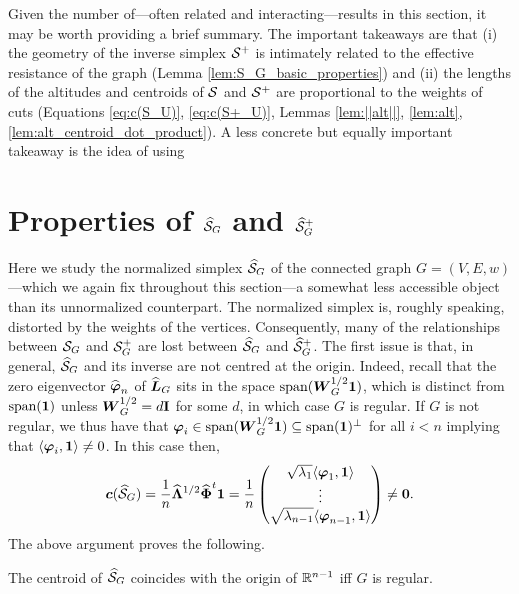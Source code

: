 Given the number of---often related and interacting---results in this section, it may be worth providing a brief summary. The important takeaways are that (i) the geometry of the inverse simplex $\mathcal{S}^+$ is intimately related to the effective resistance of the graph (Lemma \ref{lem:S_G_basic_properties}) and (ii) the lengths of the altitudes and centroids of $\mathcal{S}$ and $\mathcal{S}^+$ are proportional to the weights of cuts (Equations \eqref{eq:c(S_U)}, \eqref{eq:c(S+_U)}, Lemmas \ref{lem:||alt||}, \ref{lem:alt}, \ref{lem:alt_centroid_dot_product}). A less concrete but equally important takeaway is the idea of using  

\section{Properties of \texorpdfstring{$\widehat{\mathcal{S}}_G$}{the normalized Simplex} and \texorpdfstring{$\widehat{\mathcal{S}}_G^+$}{and its inverse}}
\label{sec:Sn_G}

Here we study the normalized simplex $\widehat{\mathcal{S}}_G$ of the connected graph $G=(V,E,w)$---which we again fix throughout this section---a somewhat less accessible object than its unnormalized counterpart.  The normalized simplex is, roughly speaking, distorted by the weights of the vertices. Consequently, many of the relationships between $\mathcal{S}_G$ and $\mathcal{S}_G^+$ are lost between $\widehat{\mathcal{S}}_G$ and $\widehat{\mathcal{S}}_G^+$. The first issue is that, in general, $\widehat{\mathcal{S}}_G$ and its inverse are not centred at the origin. Indeed, recall that the zero eigenvector $\widehat{\vb*{\varphi}}_n$ of $\widehat{\vb*{L}}_G$ sits in the space $\textnormal{span}(\vb*{W}^{1/2}_G\vb{1})$, which is distinct from $\textnormal{span}(\vb{1})$ unless $\vb*{W}^{1/2}_G=d\vb{I}$ for some $d$, in which case $G$ is regular.
If $G$ is not regular, we thus have that $\vb*{\varphi}_i \in \textnormal{span}(\vb*{W}^{1/2}_G\vb{1})\subseteq \textnormal{span}(\vb{1})^\perp$ for all $i<n$ implying that $\langle \vb*{\varphi}_i,\vb{1}\rangle \neq 0$. In this case then,  
 \[\vb*{c}(\widehat{\mathcal{S}}_G) = \frac{1}{n} \widehat{\vb{\Lambda}}^{1/2}\widehat{\boldsymbol{\Phi}}^t \vb{1} = \frac{1}{n} \begin{pmatrix}
 \sqrt{\lambda_1}\langle \vb*{\varphi}_1,\vb{1}\rangle \\
 \vdots \\
\sqrt{ \lambda_{n-1}}\langle \vb*{\varphi}_{n-1},\vb{1} \rangle
 \end{pmatrix}\neq \vb{0}.\]
The above argument proves the following.

\begin{lemma}
	\label{lem:centroid_normalized}
	The centroid of $\widehat{\mathcal{S}}_G$ coincides with the origin of $\mathbb{R}^{n-1}$ iff $G$ is regular. 
\end{lemma}

